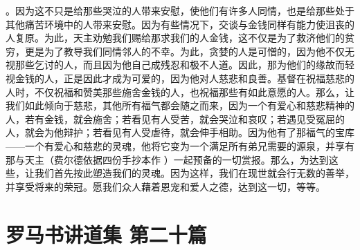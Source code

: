 。因为这不只是给那些哭泣的人带来安慰，使他们有许多人同情，也是给那些处于其他痛苦环境中的人带来安慰。因为有些情况下，交谈与金钱同样有能力使沮丧的人复原。为此，天主劝勉我们赐给那求我们的人金钱，这不仅是为了救济他们的贫穷，更是为了教导我们同情邻人的不幸。为此，贪婪的人是可憎的，因为他不仅无视那些乞讨的人，而且因为他自己成残忍和极不人道。因此，那为他们的缘故而轻视金钱的人，正是因此才成为可爱的，因为他对人慈悲和良善。基督在祝福慈悲的人时，不仅祝福和赞美那些施舍金钱的人，也祝福那些有如此意愿的人。那么，让我们如此倾向于慈悲，其他所有福气都会随之而来，因为一个有爱心和慈悲精神的人，若有金钱，就会施舍；若看见有人受苦，就会哭泣和哀叹；若遇见受冤屈的人，就会为他辩护；若看见有人受虐待，就会伸手相助。因为他有了那福气的宝库——一个有爱心和慈悲的灵魂，他将它变为一个满足所有弟兄需要的源泉，并享有那与天主（费尔德依据四份手抄本作  ）一起预备的一切赏报。那么，为达到这些，让我们首先按此塑造我们的灵魂。因为这样，我们在现世就会行无数的善举，并享受将来的荣冠。愿我们众人藉着恩宠和爱人之德，达到这一切，等等。\par



\section{罗马书讲道集 第二十篇}

\par

\par

